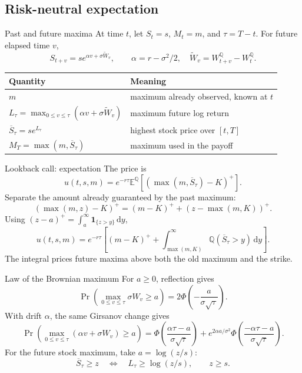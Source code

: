 \documentclass[handout,10pt,t,aspectratio=169]{beamer}
\newcommand{\E}{\mathbb E}
\newcommand{\Q}{\mathbb Q}
\newcommand{\dd}{\,\mathrm d}
\newcommand{\ind}{\mathbf 1}
\begin{document}
\subsection{Risk-neutral expectation}

\begin{frame}{Past and future maxima}
\small
At time \(t\), let \(S_t=s\), \(M_t=m\), and \(\tau=T-t\).
For future elapsed time \(v\),
\[
 S_{t+v}=s e^{\alpha v+\sigma\widetilde W_v},\qquad
 \alpha=r-\sigma^2/2,\quad \widetilde W_v=W^\Q_{t+v}-W^\Q_t.
\]
\begin{center}\begin{tabular}{ll}
\toprule Quantity & Meaning\\\midrule
\(m\) & maximum already observed, known at \(t\)\\[.4em]
\(L_\tau=\max_{0\leq v\leq\tau}(\alpha v+\sigma\widetilde W_v)\)
& maximum future log return\\[.4em]
\(\overline S_\tau=s e^{L_\tau}\) & highest stock price over \([t,T]\)\\[.4em]
\(M_T=\max(m,\overline S_\tau)\) & maximum used in the payoff\\\bottomrule
\end{tabular}\end{center}
\end{frame}

\begin{frame}{Lookback call: expectation}
\small
The price is
\[
 u(t,s,m)=e^{-r\tau}\E^\Q[(\max(m,\overline S_\tau)-K)^+].
\]
Separate the amount already guaranteed by the past maximum:
\[
 (\max(m,z)-K)^+=(m-K)^++(z-\max(m,K))^+.
\]
Using \((z-a)^+=\int_a^\infty\ind_{\{z>y\}}\dd y\),
\[
 \boxed{u(t,s,m)=e^{-r\tau}\left[(m-K)^+
 +\int_{\max(m,K)}^\infty\Q(\overline S_\tau>y)\dd y\right].}
\]
The integral prices future maxima above both the old maximum and the strike.
\end{frame}

\begin{frame}{Law of the Brownian maximum}
\small
For \(a\geq0\), reflection gives
\[
 \Pr\!\left(\max_{0\leq v\leq\tau}\sigma W_v\geq a\right)
 =2\Phi\!\left(-\frac a{\sigma\sqrt\tau}\right).
\]
With drift \(\alpha\), the same Girsanov change gives
\[
 \Pr\!\left(\max_{0\leq v\leq\tau}(\alpha v+\sigma W_v)\geq a\right)
 =\Phi\!\left(\frac{\alpha\tau-a}{\sigma\sqrt\tau}\right)
 +e^{2\alpha a/\sigma^2}\Phi\!\left(\frac{-\alpha\tau-a}{\sigma\sqrt\tau}\right).
\]
For the future stock maximum, take \(a=\log(z/s)\):
\[
 \overline S_\tau\geq z
 \quad\Longleftrightarrow\quad L_\tau\geq\log(z/s),\qquad z\geq s.
\]
\end{frame}
\end{document}
